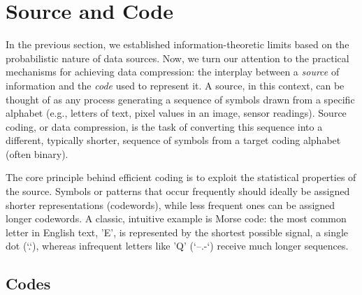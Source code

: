 \section{Source and Code} \label{sec:source_and_codes}


\noindent In the previous section, we established information-theoretic limits based on the probabilistic nature of data sources. Now, we turn our attention to the practical mechanisms for achieving data compression: the interplay between a \emph{source} of information and the \emph{code} used to represent it. A source, in this context, can be thought of as any process generating a sequence of symbols drawn from a specific alphabet (e.g., letters of text, pixel values in an image, sensor readings). Source coding, or data compression, is the task of converting this sequence into a different, typically shorter, sequence of symbols from a target coding alphabet (often binary).

\noindent The core principle behind efficient coding is to exploit the statistical properties of the source. Symbols or patterns that occur frequently should ideally be assigned shorter representations (codewords), while less frequent ones can be assigned longer codewords. A classic, intuitive example is Morse code: the most common letter in English text, 'E', is represented by the shortest possible signal, a single dot (`.`), whereas infrequent letters like 'Q' (`--.-`) receive much longer sequences.


\subsection{Codes}

